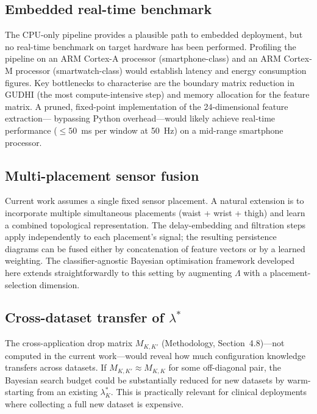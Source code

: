 \subsection{Embedded real-time benchmark}

The CPU-only pipeline provides a plausible path to embedded deployment, but no
real-time benchmark on target hardware has been performed.  Profiling the pipeline
on an ARM Cortex-A processor (smartphone-class) and an ARM Cortex-M processor
(smartwatch-class) would establish latency and energy consumption figures.  Key
bottlenecks to characterise are the boundary matrix reduction in GUDHI (the
most compute-intensive step) and memory allocation for the feature matrix.  A
pruned, fixed-point implementation of the 24-dimensional feature extraction---
bypassing Python overhead---would likely achieve real-time performance ($\leq50$~ms
per window at 50~Hz) on a mid-range smartphone processor.

\subsection{Multi-placement sensor fusion}

Current work assumes a single fixed sensor placement.  A natural extension is to
incorporate multiple simultaneous placements (waist + wrist + thigh) and learn a
combined topological representation.  The delay-embedding and filtration steps apply
independently to each placement's signal; the resulting persistence diagrams can be
fused either by concatenation of feature vectors or by a learned weighting.  The
classifier-agnostic Bayesian optimisation framework developed here extends
straightforwardly to this setting by augmenting $\Lambda$ with a placement-selection
dimension.

\subsection{Cross-dataset transfer of $\lambda^*$}

The cross-application drop matrix $M_{K,K'}$ (Methodology, Section~4.8)---not
computed in the current work---would reveal how much configuration knowledge
transfers across datasets.  If $M_{K,K'}\approx M_{K,K}$ for some off-diagonal
pair, the Bayesian search budget could be substantially reduced for new datasets
by warm-starting from an existing $\lambda^*_K$.  This is practically relevant for
clinical deployments where collecting a full new dataset is expensive.

